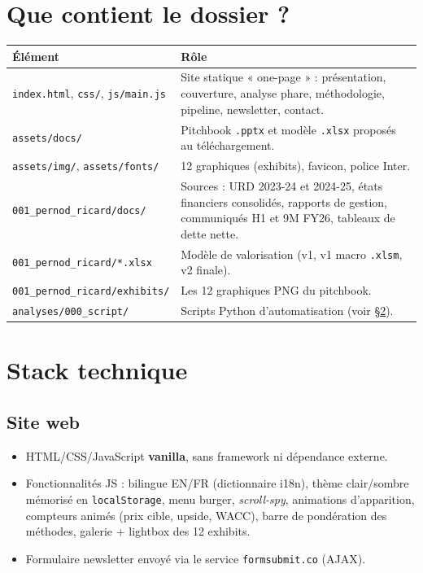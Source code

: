\documentclass[11pt,a4paper]{article}
\begin{document}
\section{Que contient le dossier ?}
\begin{table}[H]\centering\small
\begin{tabular}{>{\raggedright\arraybackslash}p{5.6cm}p{9.6cm}}
\toprule
\textbf{Élément} & \textbf{Rôle} \\
\midrule
\texttt{index.html}, \texttt{css/}, \texttt{js/main.js} & Site statique « one-page » : présentation, couverture, analyse phare, méthodologie, pipeline, newsletter, contact. \\
\texttt{assets/docs/} & Pitchbook \texttt{.pptx} et modèle \texttt{.xlsx} proposés au téléchargement. \\
\texttt{assets/img/}, \texttt{assets/fonts/} & 12 graphiques (exhibits), favicon, police Inter. \\
\texttt{001\_pernod\_ricard/docs/} & Sources : URD 2023-24 et 2024-25, états financiers consolidés, rapports de gestion, communiqués H1 et 9M FY26, tableaux de dette nette. \\
\texttt{001\_pernod\_ricard/*.xlsx} & Modèle de valorisation (v1, v1 macro \texttt{.xlsm}, v2 finale). \\
\texttt{001\_pernod\_ricard/exhibits/} & Les 12 graphiques PNG du pitchbook. \\
\texttt{analyses/000\_script/} & Scripts Python d'automatisation (voir §\ref{sec:tech}). \\
\bottomrule
\end{tabular}
\end{table}

\section{Stack technique}\label{sec:tech}
\subsection{Site web}
\begin{itemize}
  \item HTML/CSS/JavaScript \textbf{vanilla}, sans framework ni dépendance externe.
  \item Fonctionnalités JS : bilingue EN/FR (dictionnaire i18n), thème clair/sombre mémorisé en
        \texttt{localStorage}, menu burger, \emph{scroll-spy}, animations d'apparition, compteurs
        animés (prix cible, upside, WACC), barre de pondération des méthodes, galerie + lightbox
        des 12 exhibits.
  \item Formulaire newsletter envoyé via le service \texttt{formsubmit.co} (AJAX).
\end{itemize}
\end{document}
